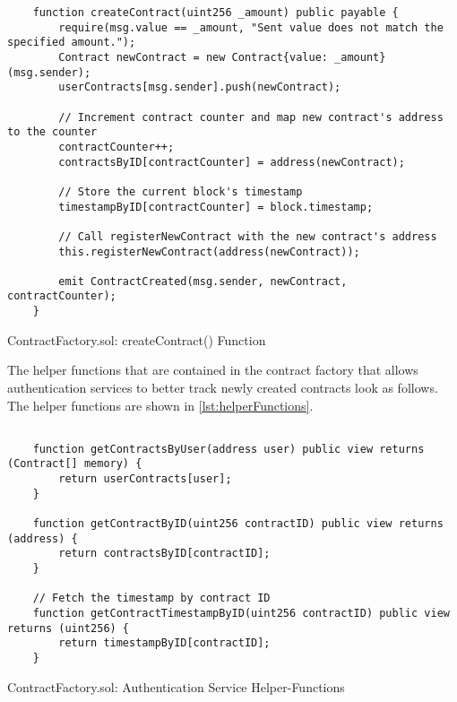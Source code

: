 \lstset{
  basicstyle=\footnotesize\ttfamily,
  breaklines=true,
  numbers=left,
  firstnumber=39,
}

\begin{Listing}
\begin{lstlisting}
    function createContract(uint256 _amount) public payable {
        require(msg.value == _amount, "Sent value does not match the specified amount.");
        Contract newContract = new Contract{value: _amount}(msg.sender);
        userContracts[msg.sender].push(newContract);

        // Increment contract counter and map new contract's address to the counter
        contractCounter++;
        contractsByID[contractCounter] = address(newContract);
        
        // Store the current block's timestamp
        timestampByID[contractCounter] = block.timestamp;

        // Call registerNewContract with the new contract's address
        this.registerNewContract(address(newContract));

        emit ContractCreated(msg.sender, newContract, contractCounter);
    }
\end{lstlisting}
  \caption{ContractFactory.sol: createContract() Function}
  \label{lst:createContract}
\end{Listing}



The helper functions that are contained in the contract factory that allows authentication services to better track newly created contracts look as follows. The helper functions are shown in \ref{lst:helperFunctions}.

\lstset{
  basicstyle=\footnotesize\ttfamily,
  breaklines=true,
  numbers=left,
  firstnumber=57
}

\begin{Listing}
\begin{lstlisting}

    function getContractsByUser(address user) public view returns (Contract[] memory) {
        return userContracts[user];
    }

    function getContractByID(uint256 contractID) public view returns (address) {
        return contractsByID[contractID];
    }

    // Fetch the timestamp by contract ID
    function getContractTimestampByID(uint256 contractID) public view returns (uint256) {
        return timestampByID[contractID];
    }

\end{lstlisting}
  \caption{ContractFactory.sol: Authentication Service Helper-Functions}
  \label{lst:helperFunctions}
\end{Listing}





